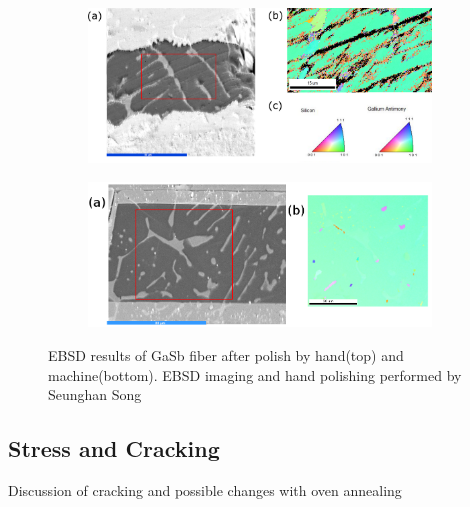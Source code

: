 \begin{figure}[h]
\centering
\begin{subfigure}{\textwidth}
  \centering
  \includegraphics[width=\linewidth]{fig/ebsd.png}
  \label{fig:sfig1}
\end{subfigure}%

\begin{subfigure}{\textwidth}
  \centering
  \includegraphics[width=\linewidth]{fig/ebsd_machinepolish.png}
  \label{fig:sfig2}
\end{subfigure}%

\caption{EBSD results of GaSb fiber after polish by hand(top) and machine(bottom). EBSD imaging and hand polishing performed by Seunghan Song}
\label{fig:ebsd}
\end{figure}

\FloatBarrier
\subsection{Stress and Cracking}
Discussion of cracking and possible changes with oven annealing

